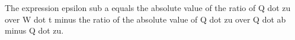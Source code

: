 The expression epsilon sub a equals the absolute value of the ratio of Q dot zu over W dot t minus the ratio of the absolute value of Q dot zu over Q dot ab minus Q dot zu.